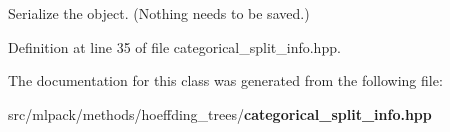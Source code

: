 Serialize the object. (Nothing needs to be saved.) 



Definition at line 35 of file categorical\+\_\+split\+\_\+info.\+hpp.



The documentation for this class was generated from the following file\+:\begin{DoxyCompactItemize}
\item 
src/mlpack/methods/hoeffding\+\_\+trees/{\bf categorical\+\_\+split\+\_\+info.\+hpp}\end{DoxyCompactItemize}
